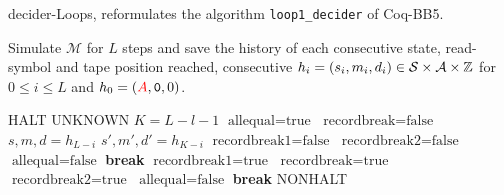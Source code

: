 \begin{algorithm}
    \caption{{\sc decider-Loops}, reformulates the algorithm \texttt{loop1\_decider} of Coq-BB5.}\label{alg:loops}

    \begin{algorithmic}[1]

        \State
        \State Simulate $\mathcal{M}$ for $L$ steps and save the history of each consecutive state, read-symbol and tape position reached, \ie consecutive $h_i = (s_i,m_i,d_i)\in\mathcal{S}\times\mathcal{A}\times\mathbb{Z}$ for $0 \leq i \leq L$ and $h_0 = (\stateA,\symbolzero,0)$.


        \State {}
        \State \Return HALT \label{alg:loops:halt}
        \EndIf
        \State \For{$l$ \textbf{in} $[0,+\infty[$ } 
        \State {} 
        \State \Return UNKNOWN \label{alg:loops:terminate}
        \State \EndIf
        \State $K = L-l-1$
        \State $\text{allequal} = \text{true}$
        \State $\text{recordbreak} = \text{false}$
        \State {} 
        \State $s,m,d = h_{L-i}$
        \State $s',m',d' = h_{K-i}$
        \State
        \State $\text{recordbreak1} = \text{false}$
        \State $\text{recordbreak2} = \text{false}$
        \State {}
        \State $\text{allequal} = \text{false}$
        \State \textbf{break}
        \EndIf
        \State {}
        \State $\text{recordbreak1} = \text{true}$
        \State $\text{recordbreak} = \text{true}$
        \EndIf
        \State {}
        \State $\text{recordbreak2} = \text{true}$
        \EndIf
        \State {}
        \State $\text{allequal} = \text{false}$
        \State \textbf{break}
        \EndIf
        \EndFor
        \State {}\label{alg:loops:test}
        \State \Return NONHALT
        \EndIf
        \EndFor

    \end{algorithmic}

\end{algorithm}

